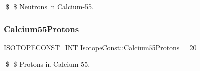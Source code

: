 \$ \$ Neutrons in Calcium-\/55. \mbox{\label{group___isotope_const-_calcium-_ca55_ga8b3fbc5ede4dd4076973e31db9a39f0f}} 
\subsubsection{\texorpdfstring{Calcium55\+Protons}{Calcium55Protons}}
{\footnotesize\ttfamily \mbox{\hyperlink{group___isotope_const-_macros_ga5f18360b3e99483a35c32d789e62621c}{I\+S\+O\+T\+O\+P\+E\+C\+O\+N\+S\+T\+\_\+\+I\+NT}} Isotope\+Const\+::\+Calcium55\+Protons = 20}

\$ \$ Protons in Calcium-\/55. 